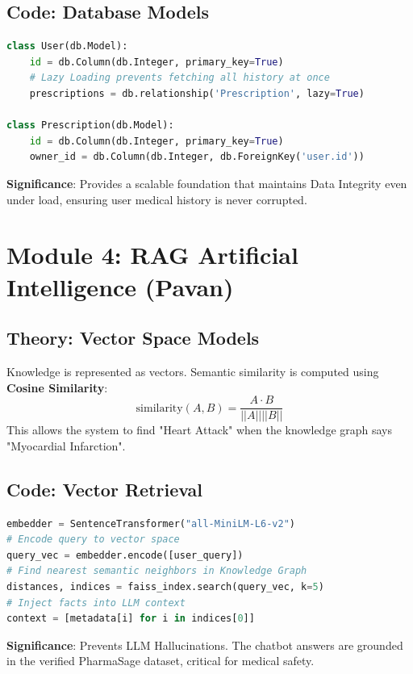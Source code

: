 \documentclass[a4paper,12pt]{report}
\begin{document}
\section{Code: Database Models}
\begin{lstlisting}[language=Python, caption=SQLAlchemy Models]
class User(db.Model):
    id = db.Column(db.Integer, primary_key=True)
    # Lazy Loading prevents fetching all history at once
    prescriptions = db.relationship('Prescription', lazy=True)

class Prescription(db.Model):
    id = db.Column(db.Integer, primary_key=True)
    owner_id = db.Column(db.Integer, db.ForeignKey('user.id'))
\end{lstlisting}
\textbf{Significance}: Provides a scalable foundation that maintains Data Integrity even under load, ensuring user medical history is never corrupted.

\chapter{Module 4: RAG Artificial Intelligence (Pavan)}

\section{Theory: Vector Space Models}
Knowledge is represented as vectors. Semantic similarity is computed using \textbf{Cosine Similarity}:
$$ \text{similarity}(A, B) = \frac{A \cdot B}{||A|| ||B||} $$
This allows the system to find "Heart Attack" when the knowledge graph says "Myocardial Infarction".

\section{Code: Vector Retrieval}
\begin{lstlisting}[language=Python, caption=FAISS Search]
embedder = SentenceTransformer("all-MiniLM-L6-v2")
# Encode query to vector space
query_vec = embedder.encode([user_query])
# Find nearest semantic neighbors in Knowledge Graph
distances, indices = faiss_index.search(query_vec, k=5)
# Inject facts into LLM context
context = [metadata[i] for i in indices[0]]
\end{lstlisting}
\textbf{Significance}: Prevents LLM Hallucinations. The chatbot answers are grounded in the verified PharmaSage dataset, critical for medical safety.
\end{document}
